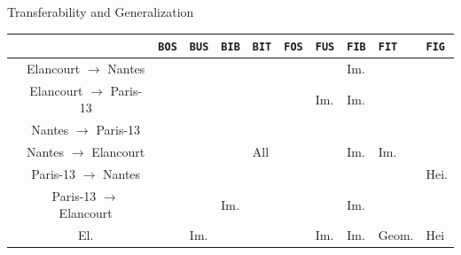 \documentclass[10pt, export]{beamer}
\begin{document}
        \begin{frame}{Transferability and Generalization}
            \begin{table}
                \scriptsize
                \begin{center}
                    \begin{tabular}{c c| x{.4cm} x{.4cm} x{.4cm} x{.4cm} |x{.4cm} x{.4cm} x{.4cm} x{.55cm} x{.4cm}}
                        \hline
                        &&\texttt{BOS}  & \texttt{BUS} &\texttt{BIB} &\texttt{BIT} &\texttt{FOS}  & \texttt{FUS} &\texttt{FIB} &\texttt{FIT} &\texttt{FIG} \\
                        \hline
                        &Elancourt $\rightarrow$ Nantes & & && & & & Im. & &\\
                        &Elancourt $\rightarrow$ Paris-13  & & & & & & Im.& Im.& &\\
                        &Nantes $\rightarrow$ Paris-13  & & &  & & & & &  &\\
                        &Nantes $\rightarrow$ Elancourt  & & & &All & & &Im. &Im. &\\
                        &Paris-13 $\rightarrow$ Nantes  & & &  & & & & &  &  Hei.\\
                        &Paris-13 $\rightarrow$ Elancourt & & & Im. & & & & Im. &  & \\
                        \hline
                        &El.   & & Im.& & & &Im. &Im. &Geom. &  Hei\\

\end{tabular}
\end{center}
\end{table}
\end{frame}
\end{document}

